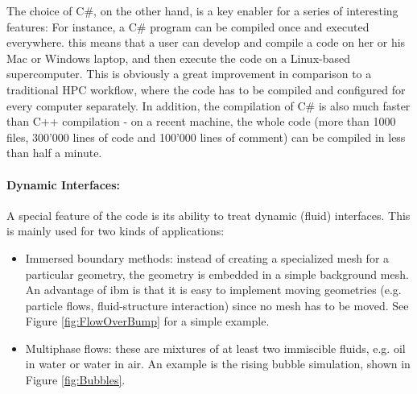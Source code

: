 \documentclass[a4paper,10pt]{report} %
\begin{document}
The choice of C\#, on the other hand, is a key enabler for a series of interesting features:
For instance, a C\# program can be compiled once and executed everywhere. this means that a user can
develop and compile a code on her or his Mac or Windows laptop, and then execute
the code on a Linux-based supercomputer. This is obviously a great improvement
in comparison to a traditional HPC workflow, where the code has to be compiled and configured
for every computer separately. In addition, the compilation of C\# is also much faster than
C++ compilation - on a recent machine, the whole \BoSSS{} code
(more than 1000 files, 300'000 lines of code and 100'000 lines of comment)
can be compiled in less than half a minute.




\paragraph{Dynamic Interfaces:} 
A special feature of the \BoSSS{} code is its ability to treat dynamic (fluid) interfaces.
This is mainly used for two kinds of applications:
\begin{itemize}
\item
Immersed boundary methods: instead of creating a specialized mesh for a particular geometry,
the geometry is embedded in a simple background mesh.
An advantage of \ac{ibm} is that it is easy to implement moving geometries
(e.g. particle flows, fluid-structure interaction) since no mesh has to be moved.
See Figure \ref{fig:FlowOverBump} for a simple example.

\item
Multiphase flows: these are mixtures of at least two immiscible fluids, 
e.g. oil in water or water in air.
An example is the rising bubble simulation, shown in Figure \ref{fig:Bubbles}.

\end{itemize}
\end{document}
